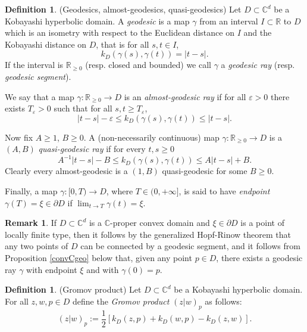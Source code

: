 \documentclass[11pt, reqno]{amsart}
\numberwithin{equation}{section}
\theoremstyle{definition}
\newtheorem{remark}[theorem]{Remark}
\newtheorem{definition}[theorem]{Definition}
\newcommand{\C}{\mathbb{C}}
\newcommand{\R}{\mathbb{R}}
\begin{document}
	
	
	
	\begin{definition}(Geodesics, almost-geodesics, quasi-geodesics)
		Let $D\subset \C^d$ be a Kobayashi hyperbolic domain. 
		A {\sl  geodesic} is a map $\gamma$ from an interval $I\subset \R$ to $D$ which is an isometry with respect to the Euclidean distance on $I$ and the Kobayashi distance on $D$, that is for all $s,t\in I$, $$k_D(\gamma(s),\gamma(t))=|t-s|.$$
		If the interval is $\R_{\geq 0}$ (resp. closed and bounded) we call $\gamma$ a {\sl geodesic ray}  (resp. {\sl geodesic segment}).
		
		We say that a map $\gamma\colon \R_{\geq 0}\to D$ is  an {\sl almost-geodesic ray} if for all $\varepsilon>0$ there exists $T_\varepsilon>0$ such that for all $s,t\geq T_\varepsilon$,
		$$|t-s|-\varepsilon\leq k_{D}(\gamma(s),\gamma(t))\leq |t-s|.$$
		
		Now fix $A\geq1$, $B\geq0$. 
		A (non-necessarily continuous) map $\gamma\colon \R_{\geq 0}\to D$ is  a $(A,B)$ {\sl quasi-geodesic ray} if for every $t,s\geq0$
		$$A^{-1}|t-s|-B\leq k_D(\gamma(s),\gamma(t))\leq A|t-s|+B.$$ Clearly every almost-geodesic is a $(1,B)$ quasi-geodesic for some $B\geq 0$.
		
		
		Finally, a map  $\gamma\colon [0,T)\to D$, where $T\in (0,+\infty]$, is said to have {\sl endpoint} $\gamma(T)=\xi\in \partial D$ if $\lim_{t\to T}\gamma(t)=\xi$.
	\end{definition}
	\begin{remark}
	If $D\subset \C^d$ is  a $\C$-proper convex domain and  $\xi\in\partial D$ is  a point of  locally finite type, then it follows by
	the generalized Hopf-Rinow theorem that any two points of $D$ can be connected by a geodesic segment, and it follows from Proposition \ref{convCgeo} below that, given any point  $p\in D$, there exists a geodesic ray $\gamma$ with endpoint $\xi$ and with $\gamma(0)=p$.
	\end{remark}
	
	\begin{definition}(Gromov product)
		Let $D\subset \C^d$ be a Kobayashi hyperbolic domain. For all $z,w,p\in D$ define the {\sl Gromov product} $(z|w)_p$ as follows:
		$$(z|w)_p:=\frac{1}{2}[k_D(z,p)+k_D(w,p)-k_D(z,w)].$$ 
	\end{definition}
	
\end{document}
